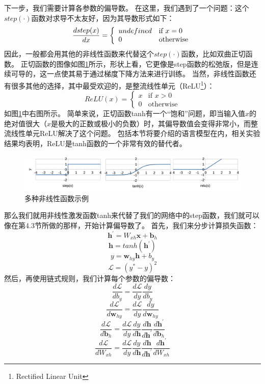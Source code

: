 \documentclass[10pt,a4paper]{ctexart}
\begin{document}
下一步，我们需要计算各参数的偏导数。
在这里，我们遇到了一个问题：这个$step(\cdot)$函数对求导不太友好，因为其导数形式如下：
\begin{equation}\label{eq:37}
 \frac{\mathnormal{d}step(x)}{\mathnormal{d}x} = \left\{ \begin{array}{ll}
  undefined & \textrm{if $x = 0$} \\
  0 & \textrm{otherwise}
  \end{array} \right. 
\end{equation}
因此，一般都会用其他的非线性函数来代替这个$step(\cdot)$函数，比如双曲正切函数。
正切函数的图像如图\ref{fig:9}所示，形状上看，它更像是step函数的松弛版，但是连续可导的，这一点使其易于通过梯度下降方法来进行训练。
当然，非线性函数还有很多其他的选择，其中最受欢迎的，是整流线性单元（ReLU\footnote{Rectified Linear Unit}）：
\begin{equation}\label{eq:38}
 ReLU(x) = \left\{ \begin{array}{ll}
  x & \textrm{if $x > 0$} \\
  0 & \textrm{otherwise}
  \end{array} \right.
\end{equation}
如图\ref{fig:9}中右图所示。
简单来说，正切函数tanh有一个“饱和”问题，即当输入值$x$的绝对值很大（$x$是极大的正数或极小的负数）时，其偏导数值会变得非常小，而整流线性单元ReLU解决了这个问题。
包括本节将要介绍的语言模型在内，相关实验结果均表明，ReLU是tanh函数的一个非常有效的替代者\cite{vaswani2013decoding}。

\begin{figure}[H]
\centering
\includegraphics[width=1\textwidth]{fig9.png}
\caption{多种非线性函数示例}
\label{fig:9}
\end{figure}

那么我们就用非线性激发函数tanh来代替了我们的网络中的step函数，我们就可以像在第4.3节所做的那样，开始计算偏导数了。
首先，我们来分步计算损失函数：
\[
 \textbf{h}^{'} = W_{xh}\textbf{x} + \textbf{b}_h
\]
\[
 \textbf{h} = tanh(\textbf{h}^{'})
\]
\[
 y = \textbf{w}_{hy} \textbf{h} + b_y
\]
\[
 \mathcal{L} = (y^* - y)^2
\]
然后，再使用链式规则，我们计算每个参数的偏导数：
\[
 \frac{d\mathcal{L}}{db_y} = \frac{d\mathcal{L}}{dy} \frac{dy}{db_y}
\]
\[
 \frac{d\mathcal{L}}{d\textbf{w}_{hy}} = \frac{d\mathcal{L}}{dy} \frac{dy}{d\textbf{w}_{hy}}
\]
\[
 \frac{d\mathcal{L}}{d\textbf{b}_h} = \frac{d\mathcal{L}}{dy} \frac{dy}{d\textbf{h}} \frac{d\textbf{h}}{d\textbf{h}^{'}} \frac{d\textbf{h}^{'}}{d\textbf{b}_h}
\]
\[
 \frac{d\mathcal{L}}{dW_{xh}} = \frac{d\mathcal{L}}{dy} \frac{dy}{d\textbf{h}} \frac{d\textbf{h}}{d\textbf{h}^{'}} \frac{d\textbf{h}^{'}}{dW_{xh}}
\]
\end{document}
